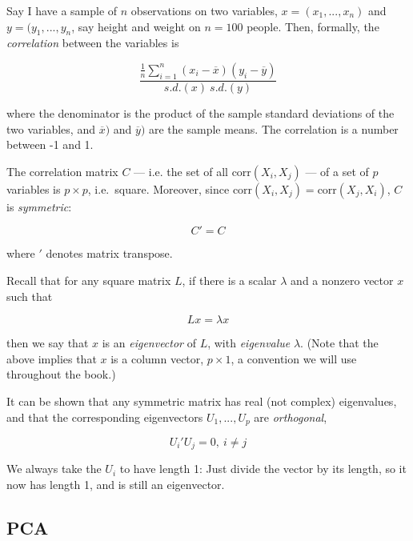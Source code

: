 Say I have a sample of $n$ observations on two variables, $x =
(x_1,...,x_n)$ and $y=(y_1,...,y_n$, say height and weight on $n = 100$
people.  Then, formally, the \textit{correlation} between the variables
is

\begin{equation}
\label{corrdef}
\frac
{\frac{1}{n} \sum_{i=1}^n (x_i-\overline{x}) (y_i-\overline{y})}
{s.d.(x) ~ s.d.(y)}
\end{equation}

where the denominator is the product of the sample standard deviations of the
two variables, and $\overline{x})$ and $\overline{y})$ are the sample
means.  The correlation is a number between -1 and 1.

The correlation matrix $C$ --- i.e. the set of all
$\textrm{corr}(X_i,X_j)$ --- of a set of $p$ variables is $p \times p$,
i.e.\ square.  Moreover, since $\textrm{corr}(X_i,X_j) =
\textrm{corr}(X_j,X_i)$, $C$ is \textit{symmetric}:

\begin{equation}
C' = C
\end{equation}

where $'$ denotes matrix transpose.  

Recall that for any square matrix $L$, if there is a scalar $\lambda$
and a nonzero vector $x$ such that 

\begin{equation}
Lx = \lambda x
\end{equation}

then we say that $x$ is an \textit{eigenvector} of $L$, with
\textit{eigenvalue} $\lambda$.  (Note that the above implies that $x$ is
a column vector, $p \times 1$, a convention we will use throughout the
book.)

It can be shown that any symmetric matrix has real (not complex)
eigenvalues, and that the corresponding eigenvectors $U_1,...,U_p$
are \textit{orthogonal},

\begin{equation}
U_i' U_j = 0, ~ i \neq j
\end{equation}

We always take the $U_i$ to have length 1:  Just divide the vector by
its length, so it now has length 1, and is still an eigenvector.

\subsection{PCA}

